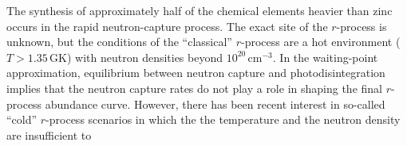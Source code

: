 The synthesis of approximately half of the chemical elements heavier than zinc %
 occurs in the rapid neutron-capture process.
The exact site of the $r$-process is unknown, but the conditions of 
the ``classical'' $r$-process %
are a hot environment ($T> 1.35$\,GK) with neutron densities beyond %
$10^{20}$\,cm$^{-3}$. %
In the waiting-point approximation, equilibrium %
 between neutron capture and photodisintegration %
implies that  the neutron capture rates do not play a role %
in shaping the final $r$-process abundance curve.
However, there has been recent interest in so-called
 ``cold'' $r$-process scenarios in which the 
the temperature and the neutron density 
are insufficient to
